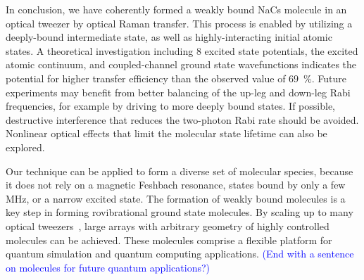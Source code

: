 \documentclass[aps,prl,twocolumn,10pt,superscriptaddress]{revtex4-1}
\begin{document}


In conclusion, we have coherently formed a weakly bound NaCs molecule in an optical tweezer
by optical Raman transfer.  This process is enabled by utilizing a deeply-bound intermediate state, as well as highly-interacting initial atomic states.  A theoretical investigation including 8 excited state potentials,
the excited atomic continuum, and coupled-channel ground state wavefunctions indicates
the potential for higher transfer efficiency than the observed value of $69$~\%.  Future experiments may benefit from better balancing of the up-leg and down-leg Rabi frequencies, for example by driving to more deeply bound states.  If possible, destructive interference that reduces the two-photon Rabi rate should be avoided.  Nonlinear optical effects that limit the molecular state lifetime can also be explored.

Our technique can be applied to form a diverse set of molecular species,
because it does not rely on a magnetic Feshbach resonance, states bound by only a few MHz,
or a narrow excited state. The formation of weakly bound molecules is a key step
in forming rovibrational ground state molecules. By scaling up to many optical tweezers~\cite{Endres2016, Barredo2018,  PhysRevLett.122.203601}, large arrays with arbitrary geometry of highly controlled molecules can be achieved. These molecules comprise a flexible platform for quantum simulation and quantum computing applications. \textcolor{blue}{(End with a sentence on molecules for future quantum applications?)}
\end{document}
